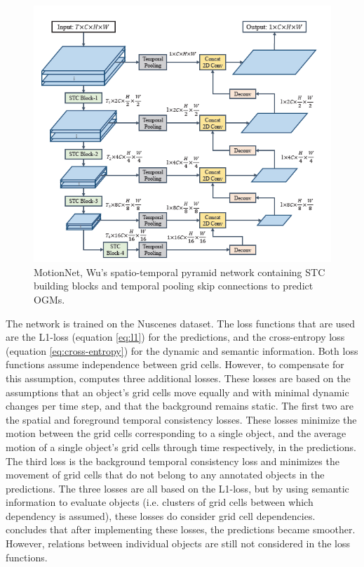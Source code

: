 \begin{figure}[h]
	\centering
	\includegraphics[width=0.6\linewidth]{Figures/Methods/STC_Block}
	\caption{MotionNet, Wu's \cite{wu2020motionnet} spatio-temporal pyramid network containing \gls{STC} building blocks and temporal pooling skip connections to predict \glspl{OGM}.}
	\label{fig:spatiotemporal}
\end{figure}
The network is trained on the Nuscenes \cite{caesar2020nuscenes} dataset. The loss functions that are used are the L1-loss (equation \ref{eq:l1}) for the predictions, and the cross-entropy loss (equation \ref{eq:cross-entropy}) for the dynamic and semantic information. Both loss functions assume independence between grid cells. However, to compensate for this assumption, \cite{wu2020motionnet} computes three additional losses. These losses are based on the assumptions that an object's grid cells move equally and with minimal dynamic changes per time step, and that the background remains static. The first two are the spatial and foreground temporal consistency losses. These losses minimize the motion between the grid cells corresponding to a single object, and the average motion of a single object's grid cells through time respectively, in the predictions. The third loss is the background temporal consistency loss and minimizes the movement of grid cells that do not belong to any annotated objects in the predictions. The three losses are all based on the L1-loss, but by using semantic information to evaluate objects (i.e. clusters of grid cells between which dependency is assumed), these losses do consider grid cell dependencies. \cite{wu2020motionnet} concludes that after implementing these losses, the predictions became smoother. However, relations between individual objects are still not considered in the loss functions. \\

